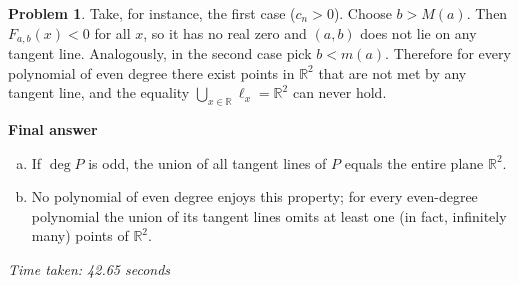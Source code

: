 \documentclass[12pt,a4paper]{article}
\theoremstyle{definition}
\newtheorem{problem}{Problem}
\begin{document}
\begin{problem}
        Take, for instance, the first case ($c_n>0$). Choose $b>M(a)$. Then $F_{a,b}(x)<0$ for all $x$, so it has no real zero and $(a,b)$ does not lie on any tangent line. Analogously, in the second case pick $b<m(a)$. Therefore for every polynomial of even degree there exist points in $\mathbb{R}^2$ that are not met by any tangent line, and the equality $\bigcup_{x\in\mathbb{R}}\ell_x = \mathbb{R}^2$ can never hold.

        \textbf{Final answer}
        \begin{enumerate}[(a)]
            \item If $\deg P$ is odd, the union of all tangent lines of $P$ equals the entire plane $\mathbb{R}^2$.
            \item No polynomial of even degree enjoys this property; for every even-degree polynomial the union of its tangent lines omits at least one (in fact, infinitely many) points of $\mathbb{R}^2$.
        \end{enumerate}
    \end{problem}

    \textit{Time taken: 42.65 seconds}
\end{document}
